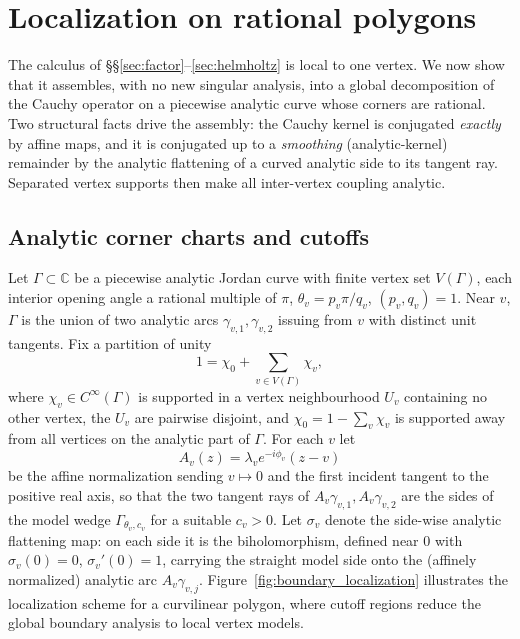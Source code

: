 \documentclass[pdflatex,sn-mathphys-num]{sn-jnl}%
\newcommand{\C}{\mathbb{C}}
\theoremstyle{thmstyleone}
\theoremstyle{thmstyletwo}
\theoremstyle{thmstylethree}
\begin{document}
\section{Localization on rational polygons}
\label{sec:localization}

The calculus of \S\S\ref{sec:factor}--\ref{sec:helmholtz} is local to one
vertex. We now show that it assembles, with no new singular analysis, into a
global decomposition of the Cauchy operator on a piecewise analytic curve whose
corners are rational. Two structural facts drive the assembly: the Cauchy kernel
is conjugated \emph{exactly} by affine maps, and it is conjugated up to a
\emph{smoothing} (analytic-kernel) remainder by the analytic flattening of a
curved analytic side to its tangent ray. Separated vertex supports then make all
inter-vertex coupling analytic.

\subsection{Analytic corner charts and cutoffs}
Let $\Gamma\subset\C$ be a piecewise analytic Jordan curve with finite vertex
set $V(\Gamma)$, each interior opening angle a rational multiple of $\pi$,
$\theta_v=p_v\pi/q_v$, $(p_v,q_v)=1$. Near $v$, $\Gamma$ is the union of two
analytic arcs $\gamma_{v,1},\gamma_{v,2}$ issuing from $v$ with distinct unit
tangents. Fix a partition of unity
\begin{equation}\label{eq:pou}
  1=\chi_0+\sum_{v\in V(\Gamma)}\chi_v,
\end{equation}
where $\chi_v\in C^\infty(\Gamma)$ is supported in a vertex neighbourhood $U_v$
containing no other vertex, the $U_v$ are pairwise disjoint, and
$\chi_0=1-\sum_v\chi_v$ is supported away from all vertices on the analytic part
of $\Gamma$. For each $v$ let
\begin{equation}\label{eq:affine}
  A_v(z)=\lambda_v e^{-i\phi_v}(z-v)
\end{equation}
be the affine normalization sending $v\mapsto0$ and the first incident tangent
to the positive real axis, so that the two tangent rays of $A_v\gamma_{v,1},
A_v\gamma_{v,2}$ are the sides of the model wedge $\Gamma_{\theta_v,c_v}$ for a
suitable $c_v>0$. Let $\sigma_v$ denote the side-wise analytic flattening map:
on each side it is the biholomorphism, defined near $0$ with $\sigma_v(0)=0$,
$\sigma_v'(0)=1$, carrying the straight model side onto the (affinely
normalized) analytic arc $A_v\gamma_{v,j}$. Figure~\ref{fig:boundary_localization} illustrates the localization scheme for a curvilinear polygon, where cutoff regions reduce the global boundary analysis to local vertex models.
\end{document}
